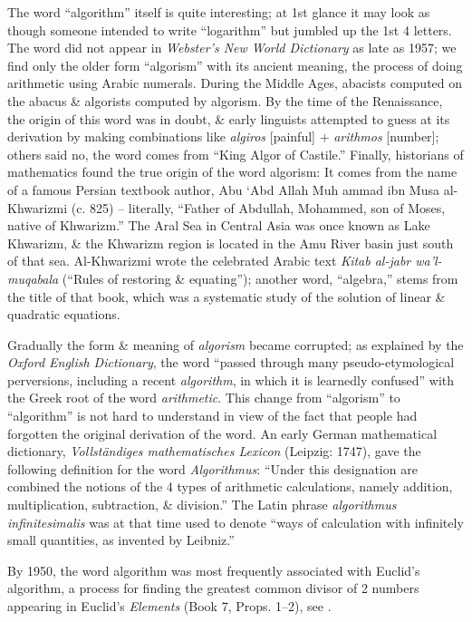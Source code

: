 \documentclass{article}
\begin{document}
The word ``algorithm'' itself is quite interesting; at 1st glance it may look as though someone intended to write ``logarithm'' but jumbled up the 1st 4 letters. The word did not appear in {\it Webster's New World Dictionary} as late as 1957; we find only the older form ``algorism'' with its ancient meaning, the process of doing arithmetic using Arabic numerals. During the Middle Ages, abacists computed on the abacus \& algorists computed by algorism. By the time of the Renaissance, the origin of this word was in doubt, \& early linguists attempted to guess at its derivation by making combinations like {\it algiros} [painful] $+$ {\it arithmos} [number]; others said no, the word comes from ``King Algor of Castile.'' Finally, historians of mathematics found the true origin of the word algorism: It comes from the name of a famous Persian textbook author, Abu `Abd Allah Muh ammad ibn Musa al-Khwarizmi (c. 825) -- literally, ``Father of Abdullah, Mohammed,
son of Moses, native of Khwarizm.'' The Aral Sea in Central Asia was once known as Lake Khwarizm, \& the Khwarizm region is located in the Amu River basin just south of that sea. Al-Khwarizmi wrote the celebrated Arabic text {\it Kitab al-jabr wa'l-muqabala} (``Rules of restoring \& equating''); another word, ``algebra,'' stems from the title of that book, which was a systematic study of the solution of linear \& quadratic equations.

Gradually the form \& meaning of {\it algorism} became corrupted; as explained by the {\it Oxford English Dictionary}, the word ``passed through many pseudo-etymological perversions, including a recent {\it algorithm}, in which it is learnedly confused'' with the Greek root of the word {\it arithmetic}. This change from ``algorism'' to ``algorithm'' is not hard to understand in view of the fact that people had forgotten the original derivation of the word. An early German mathematical dictionary, {\it Vollständiges mathematisches Lexicon} (Leipzig: 1747), gave the following definition for the word {\it Algorithmus}: ``Under this designation are combined the notions of the 4 types of arithmetic calculations, namely addition, multiplication, subtraction, \& division.'' The Latin phrase {\it algorithmus infinitesimalis} was at that time used to denote ``ways of calculation with infinitely small quantities, as invented by {\sc Leibniz}.''

By 1950, the word algorithm was most frequently associated with {\sc Euclid}'s algorithm, a process for finding the greatest common divisor of 2 numbers appearing in {\sc Euclid}'s {\it Elements} (Book 7, Props. 1--2), see \cite[Algorithm E: {\sc Euclid}'s algorithm, p. 2]{Knuth1997}.
\end{document}
